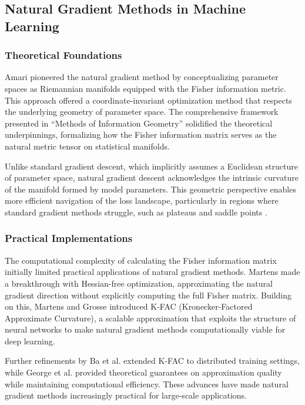 \documentclass[a4paper]{article}
\begin{document}
\subsection{Natural Gradient Methods in Machine Learning}

\subsubsection{Theoretical Foundations}
Amari \cite{amari1998natural} pioneered the natural gradient method by conceptualizing parameter spaces as Riemannian manifolds equipped with the Fisher information metric. This approach offered a coordinate-invariant optimization method that respects the underlying geometry of parameter space. The comprehensive framework presented in ``Methods of Information Geometry'' \cite{amari2000methods} solidified the theoretical underpinnings, formalizing how the Fisher information matrix serves as the natural metric tensor on statistical manifolds.

Unlike standard gradient descent, which implicitly assumes a Euclidean structure of parameter space, natural gradient descent acknowledges the intrinsic curvature of the manifold formed by model parameters. This geometric perspective enables more efficient navigation of the loss landscape, particularly in regions where standard gradient methods struggle, such as plateaus and saddle points \cite{yang1998complexity}.

\subsubsection{Practical Implementations}
The computational complexity of calculating the Fisher information matrix initially limited practical applications of natural gradient methods. Martens \cite{martens2010deep} made a breakthrough with Hessian-free optimization, approximating the natural gradient direction without explicitly computing the full Fisher matrix. Building on this, Martens and Grosse \cite{martens2015optimizing} introduced K-FAC (Kronecker-Factored Approximate Curvature), a scalable approximation that exploits the structure of neural networks to make natural gradient methods computationally viable for deep learning.

Further refinements by Ba et al. \cite{ba2017distributed} extended K-FAC to distributed training settings, while George et al. \cite{george2018fast} provided theoretical guarantees on approximation quality while maintaining computational efficiency. These advances have made natural gradient methods increasingly practical for large-scale applications.
\end{document}
